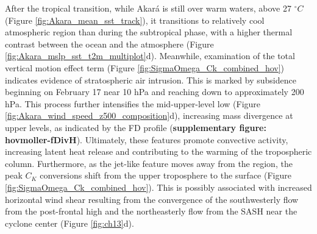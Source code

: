 \documentclass[pdflatex,sn-chicago]{sn-jnl}%
\theoremstyle{plain}
\theoremstyle{definition}
\theoremstyle{remark}
\theoremstyle{definition}
\begin{document}
After the tropical transition, while Akará is still over warm waters, above 27 $^{\circ}C$ (Figure \ref{fig:Akara_mean_sst_track}), it transitions to relatively cool atmospheric region than during the subtropical phase, with a higher thermal contrast between the ocean and the atmosphere (Figure \ref{fig:Akara_mslp_sst_t2m_multiplot}d). Meanwhile, examination of the total vertical motion effect term (Figure \ref{fig:SigmaOmega_Ck_combined_hov}) indicates evidence of stratospheric air intrusion. This is marked by subsidence beginning on February 17 near 10 hPa and reaching down to approximately 200 hPa. This process further intensifies the mid-upper-level low (Figure \ref{fig:Akara_wind_speed_z500_composition}d), increasing mass divergence at upper levels, as indicated by the FD profile (\textbf{supplementary figure: hovmoller-fDivH}). Ultimately, these features promote convective activity, increasing latent heat release and contributing to the warming of the tropospheric column. Furthermore, as the jet-like feature moves away from the region, the peak $C_K$ conversions shift from the upper troposphere to the surface (Figure \ref{fig:SigmaOmega_Ck_combined_hov}). This is possibly associated with increased horizontal wind shear resulting from the convergence of the southwesterly flow from the post-frontal high and the northeasterly flow from the SASH near the cyclone center (Figure \ref{fig:ch13}d).
\end{document}
